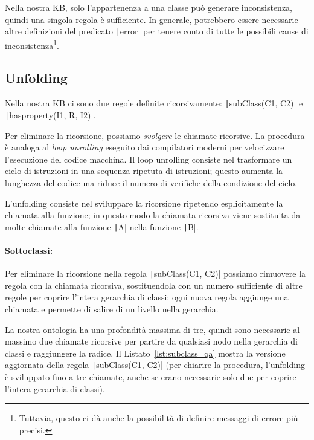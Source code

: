 Nella nostra KB, solo l'appartenenza a una classe può generare inconsistenza, quindi una singola regola è sufficiente. In generale, potrebbero essere necessarie altre definizioni del predicato \texttt|error| per tenere conto di tutte le possibili cause di inconsistenza\footnote{Tuttavia, questo ci dà anche la possibilità di definire messaggi di errore più precisi.}.

\subsection{Unfolding}
\label{sec:unfold}
Nella nostra KB ci sono due regole definite ricorsivamente: \texttt|subClass(C1, C2)| e \texttt|hasproperty(I1, R, I2)|. 

Per eliminare la ricorsione, possiamo \emph{svolgere} le chiamate ricorsive. La procedura è analoga al \emph{loop unrolling} eseguito dai compilatori moderni per velocizzare l'esecuzione del codice macchina. Il loop unrolling consiste nel trasformare un ciclo di istruzioni in una sequenza ripetuta di istruzioni; questo aumenta la lunghezza del codice ma riduce il numero di verifiche della condizione del ciclo.

L'unfolding consiste nel sviluppare la ricorsione ripetendo esplicitamente la chiamata alla funzione; in questo modo la chiamata ricorsiva viene sostituita da molte chiamate alla funzione \texttt|A| nella funzione \texttt|B|.

\paragraph{Sottoclassi:} Per eliminare la ricorsione nella regola \texttt|subClass(C1, C2)| possiamo rimuovere la regola con la chiamata ricorsiva, sostituendola con un numero sufficiente di altre regole per coprire l'intera gerarchia di classi; ogni nuova regola aggiunge una chiamata e permette di salire di un livello nella gerarchia.

La nostra ontologia ha una profondità massima di tre, quindi sono necessarie al massimo due chiamate ricorsive per partire da qualsiasi nodo nella gerarchia di classi e raggiungere la radice. Il Listato~\ref{lst:subclass_qa} mostra la versione aggiornata della regola \texttt|subClass(C1, C2)| (per chiarire la procedura, l'unfolding è sviluppato fino a tre chiamate, anche se erano necessarie solo due per coprire l'intera gerarchia di classi).

